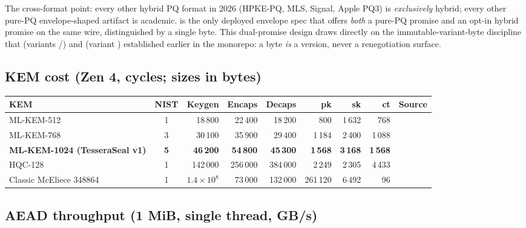 The cross-format point: every other hybrid PQ format in 2026 (HPKE-PQ, MLS, Signal, Apple PQ3) is \emph{exclusively} hybrid; every other pure-PQ envelope-shaped artifact is academic. \pqcrypt{} is the only deployed envelope spec that offers \emph{both} a pure-PQ promise and an opt-in hybrid promise on the same wire, distinguished by a single byte. This dual-promise design draws directly on the immutable-variant-byte discipline that \pqid{} (variants /) and \pqhash{} (variant ) established earlier in the \pqtoolkit{} monorepo: a byte \emph{is} a version, never a renegotiation surface.

\subsection{KEM cost (Zen 4, cycles; sizes in bytes)}

\begin{center}
\small
\begin{tabular}{@{}lcrrrrrrl@{}}
\toprule
\textbf{KEM} & \textbf{NIST} & \textbf{Keygen} & \textbf{Encaps} & \textbf{Decaps} & \textbf{pk} & \textbf{sk} & \textbf{ct} & \textbf{Source} \\
\midrule
ML-KEM-512  & 1 & 18\,800 & 22\,400 & 18\,200 & 800   & 1\,632 & 768   & \citep{mlkem-native-bench} \\
ML-KEM-768  & 3 & 30\,100 & 35\,900 & 29\,400 & 1\,184 & 2\,400 & 1\,088 & \citep{mlkem-native-bench} \\
\textbf{ML-KEM-1024 (TesseraSeal v1)} & \textbf{5} & \textbf{46\,200} & \textbf{54\,800} & \textbf{45\,300} & \textbf{1\,568} & \textbf{3\,168} & \textbf{1\,568} & \citep{mlkem-native-bench} \\
HQC-128 & 1 & 142\,000 & 256\,000 & 384\,000 & 2\,249 & 2\,305 & 4\,433 & \citep{hqc-perf} \\
Classic McEliece 348864 & 1 & $1.4 \times 10^8$ & 73\,000 & 132\,000 & 261\,120 & 6\,492 & 96 & \citep{mceliece} \\
\bottomrule
\end{tabular}
\end{center}

\subsection{AEAD throughput (1 MiB, single thread, GB/s)}

